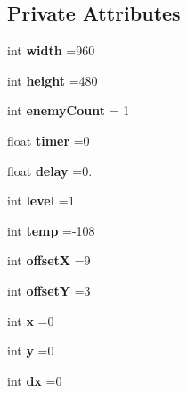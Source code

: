 \subsection*{Private Attributes}
\begin{DoxyCompactItemize}
\item 
\mbox{\label{class_xionix_a69ba1c4f5b9a41cadf52c4816aa52ce4}} 
int {\bfseries width} =960
\item 
\mbox{\label{class_xionix_aca5de1c3cff925a7a67a63699ce0f85c}} 
int {\bfseries height} =480
\item 
\mbox{\label{class_xionix_a50c0b8c78fefce6753431795ce3d5ace}} 
int {\bfseries enemy\+Count} = 1
\item 
\mbox{\label{class_xionix_ac2c6565819041d8d76216bf4266bc264}} 
float {\bfseries timer} =0
\item 
\mbox{\label{class_xionix_a1b30364ec92df4546c0c806f34e6f65c}} 
float {\bfseries delay} =0.
\item 
\mbox{\label{class_xionix_a43c33e1a1990fd43d75c78b0b7242778}} 
int {\bfseries level} =1
\item 
\mbox{\label{class_xionix_a30fb41d85dcfe05daa30c945810a2372}} 
int {\bfseries temp} =-\/108
\item 
\mbox{\label{class_xionix_a93d9c9798175e0c83207029c11b31d0e}} 
int {\bfseries offsetX} =9
\item 
\mbox{\label{class_xionix_a2c87543207dd492bc324b8974d45601b}} 
int {\bfseries offsetY} =3
\item 
\mbox{\label{class_xionix_ad9335854a2676610314852efeefc6dd3}} 
int {\bfseries x} =0
\item 
\mbox{\label{class_xionix_a3035ae240ff77cc99b31224bf20233f8}} 
int {\bfseries y} =0
\item 
\mbox{\label{class_xionix_abcd129f011878432fdb7f63870837502}} 
int {\bfseries dx} =0

\end{DoxyCompactItemize}
